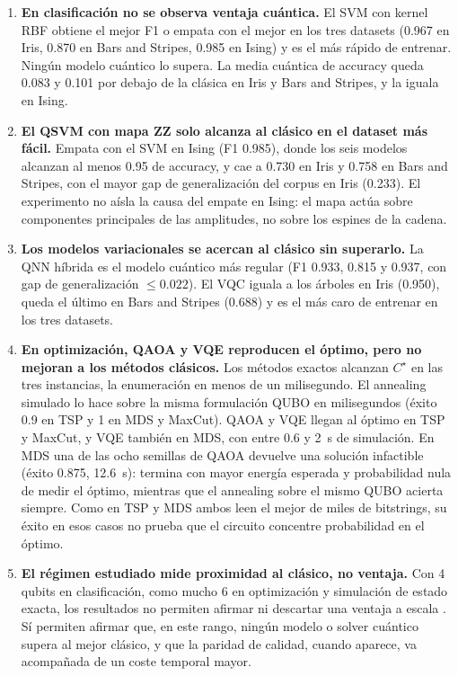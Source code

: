 \begin{enumerate}
\item \textbf{En clasificación no se observa ventaja cuántica.} El SVM con kernel RBF obtiene el mejor F1 o empata con el mejor en los tres datasets (0.967 en Iris, 0.870 en Bars and Stripes, 0.985 en Ising) y es el más rápido de entrenar. Ningún modelo cuántico lo supera. La media cuántica de accuracy queda 0.083 y 0.101 por debajo de la clásica en Iris y Bars and Stripes, y la iguala en Ising.

\item \textbf{El QSVM con mapa ZZ solo alcanza al clásico en el dataset más fácil.} Empata con el SVM en Ising (F1 0.985), donde los seis modelos alcanzan al menos 0.95 de accuracy, y cae a 0.730 en Iris y 0.758 en Bars and Stripes, con el mayor gap de generalización del corpus en Iris (0.233). El experimento no aísla la causa del empate en Ising: el mapa actúa sobre componentes principales de las amplitudes, no sobre los espines de la cadena.

\item \textbf{Los modelos variacionales se acercan al clásico sin superarlo.} La QNN híbrida es el modelo cuántico más regular (F1 0.933, 0.815 y 0.937, con gap de generalización $\le 0.022$). El VQC iguala a los árboles en Iris (0.950), queda el último en Bars and Stripes (0.688) y es el más caro de entrenar en los tres datasets.

\item \textbf{En optimización, QAOA y VQE reproducen el óptimo, pero no mejoran a los métodos clásicos.} Los métodos exactos alcanzan $C^\star$ en las tres instancias, la enumeración en menos de un milisegundo. El annealing simulado lo hace sobre la misma formulación QUBO en milisegundos (éxito 0.9 en TSP y 1 en MDS y MaxCut). QAOA y VQE llegan al óptimo en TSP y MaxCut, y VQE también en MDS, con entre 0.6 y 2~s de simulación. En MDS una de las ocho semillas de QAOA devuelve una solución infactible (éxito 0.875, 12.6~s): termina con mayor energía esperada y probabilidad nula de medir el óptimo, mientras que el annealing sobre el mismo QUBO acierta siempre. Como en TSP y MDS ambos leen el mejor de miles de bitstrings, su éxito en esos casos no prueba que el circuito concentre probabilidad en el óptimo.

\item \textbf{El régimen estudiado mide proximidad al clásico, no ventaja.} Con 4 qubits en clasificación, como mucho 6 en optimización y simulación de estado exacta, los resultados no permiten afirmar ni descartar una ventaja a escala \citep{preskill2018, thanasilp2022}. Sí permiten afirmar que, en este rango, ningún modelo o solver cuántico supera al mejor clásico, y que la paridad de calidad, cuando aparece, va acompañada de un coste temporal mayor.
\end{enumerate}
